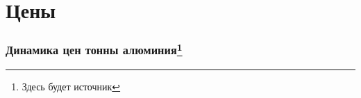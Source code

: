 \section{Цены}

\begin{frame}[fragile]
    \frametitle{Динамика цен тонны алюминия\footnote{Здесь будет источник}}
    \begin{center}
    
    \end{center}
\end{frame}